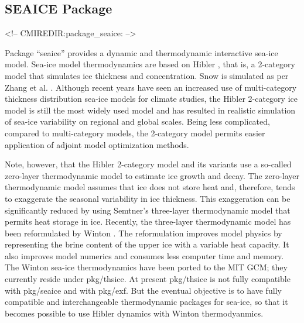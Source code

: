 


\subsection{SEAICE Package}
\label{sec:pkg:seaice}
\begin{rawhtml}
<!-- CMIREDIR:package_seaice: -->
\end{rawhtml}

Package ``seaice'' provides a dynamic and thermodynamic interactive
sea-ice model.  Sea-ice model thermodynamics are based on Hibler
\cite{hib80}, that is, a 2-category model that simulates ice thickness
and concentration.  Snow is simulated as per Zhang et al.
\cite{zha98a}.  Although recent years have seen an increased use of
multi-category thickness distribution sea-ice models for climate
studies, the Hibler 2-category ice model is still the most widely used
model and has resulted in realistic simulation of sea-ice variability
on regional and global scales.  Being less complicated, compared to
multi-category models, the 2-category model permits easier application
of adjoint model optimization methods.

Note, however, that the Hibler 2-category model and its variants use a
so-called zero-layer thermodynamic model to estimate ice growth and
decay.  The zero-layer thermodynamic model assumes that ice does not
store heat and, therefore, tends to exaggerate the seasonal
variability in ice thickness.  This exaggeration can be significantly
reduced by using Semtner's \cite{sem76} three-layer thermodynamic
model that permits heat storage in ice.  Recently, the three-layer
thermodynamic model has been reformulated by Winton \cite{win00}.  The
reformulation improves model physics by representing the brine content
of the upper ice with a variable heat capacity.  It also improves
model numerics and consumes less computer time and memory.  The Winton
sea-ice thermodynamics have been ported to the MIT GCM; they currently
reside under pkg/thsice.  At present pkg/thsice is not fully
compatible with pkg/seaice and with pkg/exf.  But the eventual
objective is to have fully compatible and interchangeable
thermodynamic packages for sea-ice, so that it becomes possible to use
Hibler dynamics with Winton thermodyanmics.

